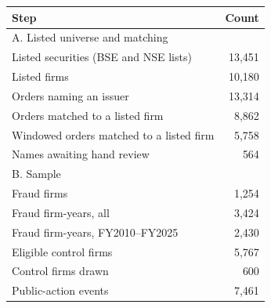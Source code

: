 \begin{tabular*}{\textwidth}[]{l@{\extracolsep\fill}r}
\toprule
Step & Count\\
\midrule
\multicolumn{2}{l}{A. Listed universe and matching}\\
Listed securities (BSE and NSE lists) & 13,451\\
Listed firms & 10,180\\
Orders naming an issuer & 13,314\\
Orders matched to a listed firm & 8,862\\
Windowed orders matched to a listed firm & 5,758\\
Names awaiting hand review & 564\\
\midrule
\multicolumn{2}{l}{B. Sample}\\
Fraud firms & 1,254\\
Fraud firm-years, all & 3,424\\
Fraud firm-years, FY2010--FY2025 & 2,430\\
Eligible control firms & 5,767\\
Control firms drawn & 600\\
Public-action events & 7,461\\
\bottomrule
\end{tabular*}

